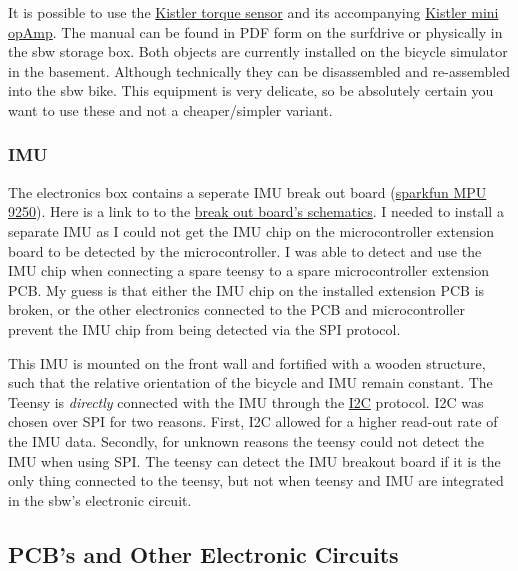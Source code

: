 It is possible to use the \href{https://www.kistler.com/US/en/p/reaction-torque-transducer-9349a/000000000018007698}{Kistler torque sensor} and its accompanying \href{https://www.kistler.com/US/en/cp/industrial-miniature-charge-amplifiers-miniamp-5030a/P0000265}{Kistler mini opAmp}. 
The manual can be found in PDF form on the surfdrive or physically in the sbw storage box.
Both objects are currently installed on the bicycle simulator in the basement.
Although technically they can be disassembled and re-assembled into the sbw bike. 
This equipment is very delicate, so be absolutely certain you want to use these and not a cheaper/simpler variant.

\subsubsection{IMU}
The electronics box contains a seperate IMU break out board (\href{https://learn.sparkfun.com/tutorials/mpu-9250-hookup-guide/all}{sparkfun MPU 9250}).
Here is a link to to the \href{https://cdn.sparkfun.com/datasheets/Sensors/IMU/SparkFun_MPU-9250_Breakout.pdf}{break out board's schematics}.
I needed to install a separate IMU as I could not get the IMU chip on the microcontroller extension board to be detected by the microcontroller. I was able to detect and use the IMU chip when connecting a spare teensy to a spare microcontroller extension PCB. My guess is that either the IMU chip on the installed extension PCB is broken, or the other electronics connected to the PCB and microcontroller prevent the IMU chip from being detected via the SPI protocol.

This IMU is mounted on the front wall and fortified with a wooden structure, such that the relative orientation of the bicycle and IMU remain constant.
The Teensy is \textit{directly} connected with the IMU through the \href{https://en.wikipedia.org/wiki/I%C2%B2C}{I2C} protocol.
I2C was chosen over SPI for two reasons.
First, I2C allowed for a higher read-out rate of the IMU data.
Secondly, for unknown reasons the teensy could not detect the IMU when using SPI. 
The teensy can detect the IMU breakout board if it is the only thing connected to the teensy, but not when teensy and IMU are integrated in the sbw's electronic circuit.

\subsection{PCB's and Other Electronic Circuits}
